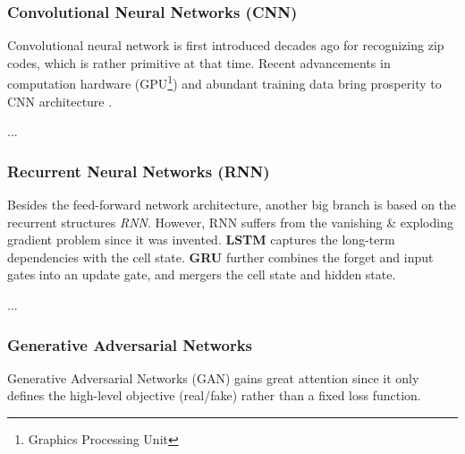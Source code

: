 \subsubsection{Convolutional Neural Networks (CNN)} \hfill 

Convolutional neural network is first introduced decades ago \cite{LeCun:1989:BAH:1351079.1351090} for recognizing zip codes, which is rather primitive at that time. Recent advancements in computation hardware (GPU\footnote{Graphics Processing Unit}) and abundant training data \cite{ILSVRC15} bring prosperity to CNN architecture \cite{NIPS2012_4824}.





...


\subsubsection{Recurrent Neural Networks (RNN)} \hfill 

Besides the feed-forward network architecture, another big branch is based on the recurrent structures \emph{RNN}. However, RNN suffers from the vanishing \& exploding gradient problem since it was invented. \textbf{LSTM} captures the long-term dependencies with the cell state. \textbf{GRU} further combines the forget and input gates into an update gate, and mergers the cell state and hidden state. 

...

\subsubsection{Generative Adversarial Networks}\hfill 

Generative Adversarial Networks (GAN) \cite{gan} gains great attention since it only defines the high-level objective (real/fake) rather than a fixed loss function. 


